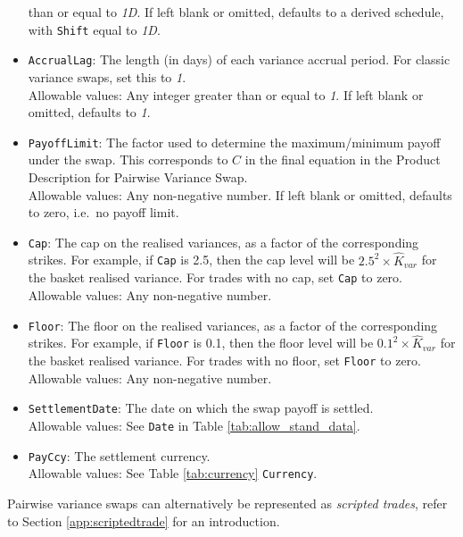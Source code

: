 \begin{itemize}
  than or equal to \emph{1D}. If left blank or omitted, defaults to a derived schedule, with \lstinline!Shift! equal to \emph{1D}.
  \item{} \lstinline!AccrualLag!: The length (in days) of each variance accrual period. For classic variance swaps,
  set this to \emph{1}. \\
    Allowable values: Any integer greater than or equal to \emph{1}. If left blank or omitted, defaults to \emph{1}.
  \item{} \lstinline!PayoffLimit!: The factor used to determine the maximum/minimum payoff under the swap. This corresponds to $C$
  in the final equation in the Product Description for Pairwise Variance Swap. \\
    Allowable values: Any non-negative number. If left blank or omitted, defaults to zero, i.e.\ no payoff limit.
  \item{} \lstinline!Cap!: The cap on the realised variances, as a factor of the corresponding strikes. For example,
  if \lstinline!Cap! is 2.5, then the cap level will be $2.5^2 \times \hat{K}_{var}$ for the basket realised variance.
  For trades with no cap, set \lstinline!Cap! to zero. \\
    Allowable values: Any non-negative number.
  \item{} \lstinline!Floor!:  The floor on the realised variances, as a factor of the corresponding strikes. For example,
  if \lstinline!Floor! is 0.1, then the floor level will be $0.1^2 \times \hat{K}_{var}$ for the basket realised variance.
  For trades with no floor, set \lstinline!Floor! to zero. \\
    Allowable values: Any non-negative number.
  \item{} \lstinline!SettlementDate!: The date on which the swap payoff is settled. \\
    Allowable values: See \lstinline!Date! in Table \ref{tab:allow_stand_data}.
  \item{} \lstinline!PayCcy!: The settlement currency. \\
    Allowable values: See Table \ref{tab:currency} \lstinline!Currency!.
\end{itemize}

Pairwise variance swaps can alternatively be represented as {\em scripted trades}, refer to Section \ref{app:scriptedtrade} for an introduction.

